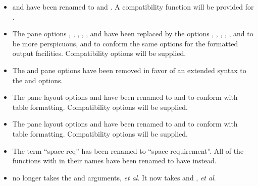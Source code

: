 \begin{itemize}
\item {} and  have been renamed to
 and .  A compatibility function will be provided
for .

\item The pane options , , , , , and
 have been replaced by the options , ,
, , , and  to be more
perspicuous, and to conform the same options for the formatted output
facilities.  Compatibility options will be supplied.

\item The  and  pane options have been removed in favor
of an extended syntax to the  and  options.

\item The pane layout options  and  have been renamed to
 and  to conform with table formatting.  Compatibility
options will be supplied.

\item The pane layout options  and  have been renamed to
 and  to conform with table formatting.
Compatibility options will be supplied.

\item The term ``space req'' has been renamed to ``space requirement''.  All of
the functions with  in their names have been renamed to have
 instead.

\item {} no longer takes the  and 
arguments, {\it et al}.  It now takes  and , {\it et al}.
\end{itemize}
